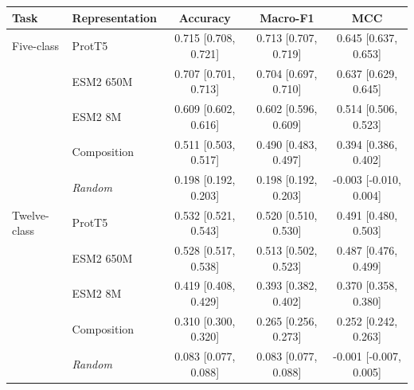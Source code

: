 \begin{tabular}{llccc}
\hline
\textbf{Task} & \textbf{Representation} & \textbf{Accuracy} & \textbf{Macro-F1} & \textbf{MCC} \\
\hline
Five-class & ProtT5 & 0.715 {\scriptsize[0.708, 0.721]} & 0.713 {\scriptsize[0.707, 0.719]} & 0.645 {\scriptsize[0.637, 0.653]} \\
 & ESM2 650M & 0.707 {\scriptsize[0.701, 0.713]} & 0.704 {\scriptsize[0.697, 0.710]} & 0.637 {\scriptsize[0.629, 0.645]} \\
 & ESM2 8M & 0.609 {\scriptsize[0.602, 0.616]} & 0.602 {\scriptsize[0.596, 0.609]} & 0.514 {\scriptsize[0.506, 0.523]} \\
 & Composition & 0.511 {\scriptsize[0.503, 0.517]} & 0.490 {\scriptsize[0.483, 0.497]} & 0.394 {\scriptsize[0.386, 0.402]} \\
 & \textit{Random} & 0.198 {\scriptsize[0.192, 0.203]} & 0.198 {\scriptsize[0.192, 0.203]} & -0.003 {\scriptsize[-0.010, 0.004]} \\
\hline
Twelve-class & ProtT5 & 0.532 {\scriptsize[0.521, 0.543]} & 0.520 {\scriptsize[0.510, 0.530]} & 0.491 {\scriptsize[0.480, 0.503]} \\
 & ESM2 650M & 0.528 {\scriptsize[0.517, 0.538]} & 0.513 {\scriptsize[0.502, 0.523]} & 0.487 {\scriptsize[0.476, 0.499]} \\
 & ESM2 8M & 0.419 {\scriptsize[0.408, 0.429]} & 0.393 {\scriptsize[0.382, 0.402]} & 0.370 {\scriptsize[0.358, 0.380]} \\
 & Composition & 0.310 {\scriptsize[0.300, 0.320]} & 0.265 {\scriptsize[0.256, 0.273]} & 0.252 {\scriptsize[0.242, 0.263]} \\
 & \textit{Random} & 0.083 {\scriptsize[0.077, 0.088]} & 0.083 {\scriptsize[0.077, 0.088]} & -0.001 {\scriptsize[-0.007, 0.005]} \\
\hline
\end{tabular}
